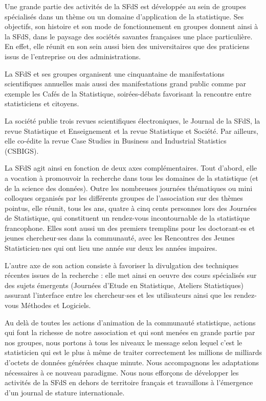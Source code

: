 Une grande partie des activit\'es de la SFdS est d\'evelopp\'ee au sein de groupes sp\'ecialis\'es dans un th\`eme ou un domaine d'application de la statistique. Ses objectifs, son histoire et son mode de fonctionnement en groupes donnent ainsi \`a la SFdS, dans le paysage des soci\'et\'es savantes fran\c{c}aises une place particuli\`ere. En effet, elle r\'eunit en son sein aussi bien des universitaires que des praticiens issus de l'entreprise ou des administrations.

La SFdS et ses groupes organisent une cinquantaine de manifestations scientifiques annuelles mais aussi des manifestations grand public comme par exemple les Caf\'es de la Statistique, soir\'ees-d\'ebats favorisant la rencontre entre statisticiens et citoyens.

La soci\'et\'e publie trois revues scientifiques \'electroniques, le Journal de la SFdS, la revue Statistique et Enseignement et la revue Statistique 
et Soci\'et\'e. Par ailleurs, elle co-\'edite la revue Case Studies in Business and Industrial Statistics (CSBIGS).

La SFdS agit ainsi en fonction de deux axes compl\'ementaires. Tout d'abord, elle a vocation \`a promouvoir la recherche dans tous les domaines de la statistique (et de la science des donn\'ees). Outre les nombreuses journ\'ees th\'ematiques ou mini colloques organis\'es par les diff\'erents groupes de l'association sur des th\`emes pointus, elle r\'eunit, tous les ans, quatre \`a cinq cents personnes lors des Journ\'ees de Statistique, qui constituent un rendez-vous incontournable de la statistique francophone. Elles sont aussi un des premiers tremplins pour les doctorant$\cdot$es et jeunes chercheur$\cdot$ses dans la communaut\'e, avec les Rencontres des Jeunes Statisticien$\cdot$nes qui ont lieu une ann\'ee sur deux les ann\'ees impaires.

L'autre axe de son action consiste \`a favoriser la divulgation des techniques r\'ecentes issues de la recherche : elle met ainsi en oeuvre des cours sp\'ecialis\'es sur des sujets \'emergents (Journ\'ees d'Etude en Statistique, Ateliers Statistiques) assurant l'interface entre les chercheur$\cdot$ses et les utilisateurs ainsi que les rendez-vous M\'ethodes et Logiciels.

Au del\`a de toutes les actions d'animation de la communaut\'e statistique, actions qui font la richesse de notre association et qui sont men\'ees en 
grande partie par nos groupes, nous portons \`a tous les niveaux le message selon lequel c'est le statisticien qui est le plus \`a m\^eme de traiter correctement les millions de milliards d’octets de donn\'ees g\'en\'er\'ees chaque minute. Nous accompagnons les adaptations n\'ecessaires \`a ce nouveau paradigme. Nous nous effor\c{c}ons de d\'evelopper les activit\'es de la SFdS en dehors de territoire fran\c{c}ais et travaillons \`a l'\'emergence d'un journal de stature internationale.

